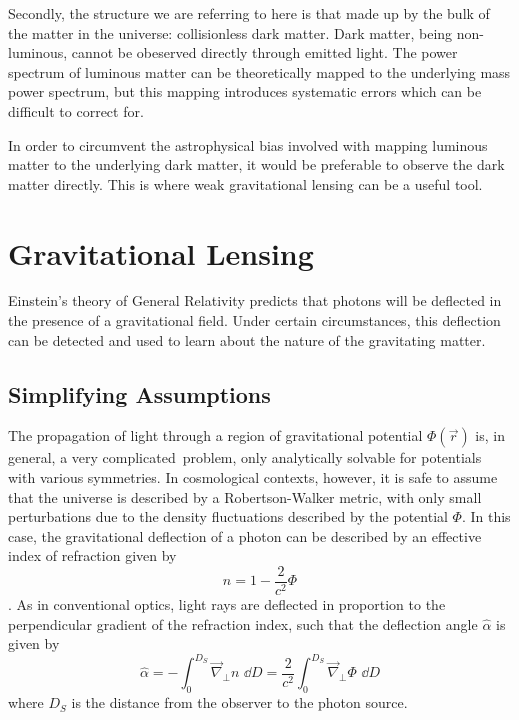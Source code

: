 Secondly, the structure we are referring to here is that made up by the bulk
of the matter in the universe: collisionless dark matter.  Dark matter,
being non-luminous, cannot be obeserved directly through emitted light.
The power spectrum of luminous matter can be theoretically mapped to the
underlying mass power spectrum, but this mapping introduces systematic
errors which can be difficult to correct for.

In order to circumvent the astrophysical bias
involved with mapping luminous matter to
the underlying dark matter, it would be preferable to observe the dark
matter directly.  This is where weak gravitational lensing can be a
useful tool.



\section{Gravitational Lensing}
\label{sec:gravitational_lensing}
Einstein's theory of General Relativity predicts that photons will be deflected
in the presence of a gravitational field.  Under certain circumstances, this
deflection can be detected and used to learn about the nature of the
gravitating matter.

\subsection{Simplifying Assumptions}
\label{sec:lensing_simplification}
The propagation of light through a region of gravitational potential
$\Phi(\vec{r})$ is, in general, a very complicated\ problem, only analytically
solvable for potentials with various symmetries.  In cosmological contexts,
however, it is safe to assume that the universe is described by a
Robertson-Walker metric, with only small perturbations due to the density
fluctuations described by the potential $\Phi$.  In this case, the
gravitational deflection of a photon can be described by an effective
index of refraction given by
\begin{equation}
  n = 1-\frac{2}{c^2}\Phi 
\end{equation}
\citep[see][and references therein]{narayan1996lectures}.
As in conventional optics, light rays are deflected in proportion to the
perpendicular gradient of the refraction index, such that the deflection angle
$\hat{\alpha}$ is given by
\begin{equation}
  \label{eq:alpha-def}
  \hat{\alpha} = -\int_0^{D_S} \vec{\nabla}_\perp n \,\,\dd D
  = \frac{2}{c^2}\int_0^{D_S} \vec{\nabla}_\perp\Phi\,\,\dd D
\end{equation}
where $D_S$ is the distance from the observer to the photon source.  

